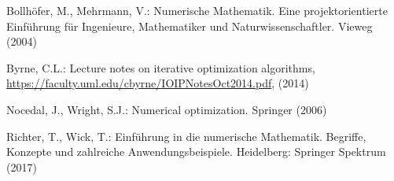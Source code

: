 \documentclass[
]{book}
\newenvironment{cslreferences}%
  {}%
  {\par}
\theoremstyle{definition}
\theoremstyle{definition}
\theoremstyle{definition}
\theoremstyle{definition}
\theoremstyle{remark}
\begin{document}
\hypertarget{refs}{}
\begin{cslreferences}
\leavevmode\hypertarget{ref-BolM04}{}%
Bollhöfer, M., Mehrmann, V.: Numerische Mathematik. Eine projektorientierte Einführung für Ingenieure, Mathematiker und Naturwissenschaftler. Vieweg (2004)

\leavevmode\hypertarget{ref-Byr14}{}%
Byrne, C.L.: Lecture notes on iterative optimization algorithms, \url{https://faculty.uml.edu/cbyrne/IOIPNotesOct2014.pdf}, (2014)

\leavevmode\hypertarget{ref-NocW06}{}%
Nocedal, J., Wright, S.J.: Numerical optimization. Springer (2006)

\leavevmode\hypertarget{ref-RicW17}{}%
Richter, T., Wick, T.: Einführung in die numerische Mathematik. Begriffe, Konzepte und zahlreiche Anwendungsbeispiele. Heidelberg: Springer Spektrum (2017)
\end{cslreferences}
\end{document}
